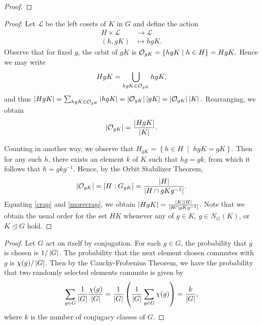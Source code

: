\documentclass[10pt]{amsart}
\begin{document}
\begin{thm}
  \begin{proof}
    
  \end{proof}
\end{thm}


\begin{thm}
  \begin{proof}
    Let $\mathcal{L}$ be the left cosets of $K$ in $G$ and define the action
    \begin{align*}
      H \times \mathcal{L} &\rightarrow \mathcal{L}\\
      (h,gK) &\mapsto hgK.
    \end{align*}
    Observe that for fixed $g$, the orbit of $gK$ is $\mathcal{O}_{gK} = \left\{hgK \;\middle\vert\; h \in H\right\} = HgK.$
    Hence we may write $$HgK = \bigcup_{hgK \in \mathcal{O}_{gK}} hgK,$$
    and thus $\left| HgK \right| = \sum_{hgK \in \mathcal{O}_{gK}} \left| hgK \right| = \left| \mathcal{O}_{gK} \right|\left| gK \right| = \left| \mathcal{O}_{gK} \right|\left| K \right|.$
    Rearranging, we obtain 
    \begin{equation}\label{crap}
          \left| \mathcal{O}_{gK} \right| = \frac{\left| HgK \right|}{\left| K \right|}.
    \end{equation}
    
    Counting in another way, we observe that $H_{gK} = \left\{h \in H \;\middle\vert\; hgK = gK\right\}$.
    Then for any such $h$, there exists an element $k$ of $K$ such that $hg = gk$, from which it follows that $h = gkg^{-1}$.
    Hence, by the Orbit Stabilizer Theorem, 
    \begin{equation}\label{morecrap}
      \left| \mathcal{O}_{gK} \right| = [H : G_{gK}] = \frac{\left| H \right|}{\left| H \cap gKg^{-1} \right|}.
    \end{equation}
    Equating \eqref{crap} and \eqref{morecrap}, we obtain $\left| HgK \right| = \frac{\left| K \right|\left| H \right|}{\left| H \cap gKg^{-1} \right|}$.
    Note that we obtain the usual order for the set $HK$ whenever any of $g \in K$, $g \in N_G(K)$, or $K \unlhd G$ hold.
  \end{proof}
\end{thm}

\begin{thm}
  \begin{proof}
    Let $G$ act on itself by conjugation.
    For each $g \in G$, the probability that $g$ is chosen is $1/\left| G \right|$.
    The probability that the next element chosen commutes with $g$ is $\chi(g)/\left| G \right|$.
    Then by the Cauchy-Frobenius Theorem, we have the probability that two randomly selected elements commute is given by 
    $$\sum_{g \in G} \frac{1}{\left| G \right|} \frac{\chi(g)}{\left| G \right|} = \frac{1}{\left| G \right|} \left(\frac{1}{\left| G \right|} \sum_{g \in G} \chi(g) \right) = \frac{k}{\left| G \right|},$$
    where $k$ is the number of conjugacy classes of $G$.
  \end{proof}
\end{thm}
\end{document}

